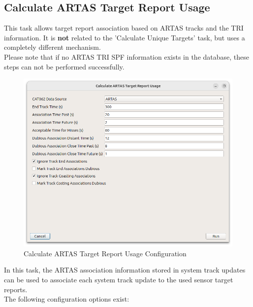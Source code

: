 \subsection{Calculate ARTAS Target Report Usage}
\label{sec:ui_associate_tr_artas}

This task allows target report association based on ARTAS tracks and the TRI information. It is \textbf{not} related to the 'Calculate Unique Targets' task, but uses a completely different mechanism. \\

Please note that if no ARTAS TRI SPF information exists in the database, these steps can not be performed successfully.\\

\begin{figure}[H]
  \center
    \includegraphics[width=16cm]{figures/artas_association_config.png}
  \caption{Calculate ARTAS Target Report Usage Configuration}
\end{figure}

In this task, the ARTAS association information stored in system track updates can be used to associate each system track update to the used sensor target reports. \\

The following configuration options exist:

